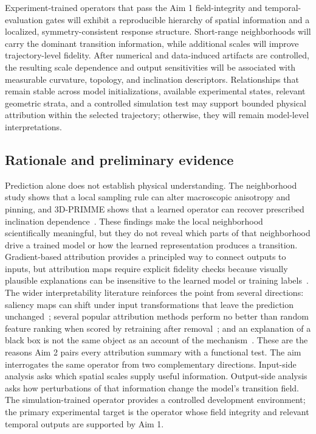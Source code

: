\documentclass[proposalMode]{ufdissertation}
\begin{document}
Experiment-trained operators that pass the Aim 1 field-integrity and temporal-evaluation gates will exhibit a reproducible hierarchy of spatial information and a localized, symmetry-consistent response structure. Short-range neighborhoods will carry the dominant transition information, while additional scales will improve trajectory-level fidelity. After numerical and data-induced artifacts are controlled, the resulting scale dependence and output sensitivities will be associated with measurable curvature, topology, and inclination descriptors. Relationships that remain stable across model initializations, available experimental states, relevant geometric strata, and a controlled simulation test may support bounded physical attribution within the selected trajectory; otherwise, they will remain model-level interpretations.

\subsection{Rationale and preliminary evidence}

Prediction alone does not establish physical understanding. The neighborhood study shows that a local sampling rule can alter macroscopic anisotropy and pinning, and 3D-PRIMME shows that a learned operator can recover prescribed inclination dependence~\cite{tian2026neighborhood,tian2026threeDprimme}. These findings make the local neighborhood scientifically meaningful, but they do not reveal which parts of that neighborhood drive a trained model or how the learned representation produces a transition. Gradient-based attribution provides a principled way to connect outputs to inputs, but attribution maps require explicit fidelity checks because visually plausible explanations can be insensitive to the learned model or training labels~\cite{sundararajan2017attribution,adebayo2018sanity}. The wider interpretability literature reinforces the point from several directions: saliency maps can shift under input transformations that leave the prediction unchanged~\cite{kindermans2019unreliability}; several popular attribution methods perform no better than random feature ranking when scored by retraining after removal~\cite{hooker2019roar}; and an explanation of a black box is not the same object as an account of the mechanism~\cite{rudin2019stopexplaining}. These are the reasons Aim 2 pairs every attribution summary with a functional test. The aim interrogates the same operator from two complementary directions. Input-side analysis asks which spatial scales supply useful information. Output-side analysis asks how perturbations of that information change the model's transition field. The simulation-trained operator provides a controlled development environment; the primary experimental target is the operator whose field integrity and relevant temporal outputs are supported by Aim 1.
\end{document}
